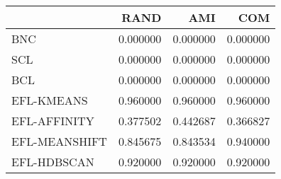 \begin{tabular}{lrrr}
\toprule
 & RAND & AMI & COM \\
\midrule
BNC & 0.000000 & 0.000000 & 0.000000 \\
SCL & 0.000000 & 0.000000 & 0.000000 \\
BCL & 0.000000 & 0.000000 & 0.000000 \\
EFL-KMEANS & 0.960000 & 0.960000 & 0.960000 \\
EFL-AFFINITY & 0.377502 & 0.442687 & 0.366827 \\
EFL-MEANSHIFT & 0.845675 & 0.843534 & 0.940000 \\
EFL-HDBSCAN & 0.920000 & 0.920000 & 0.920000 \\
\bottomrule
\end{tabular}
